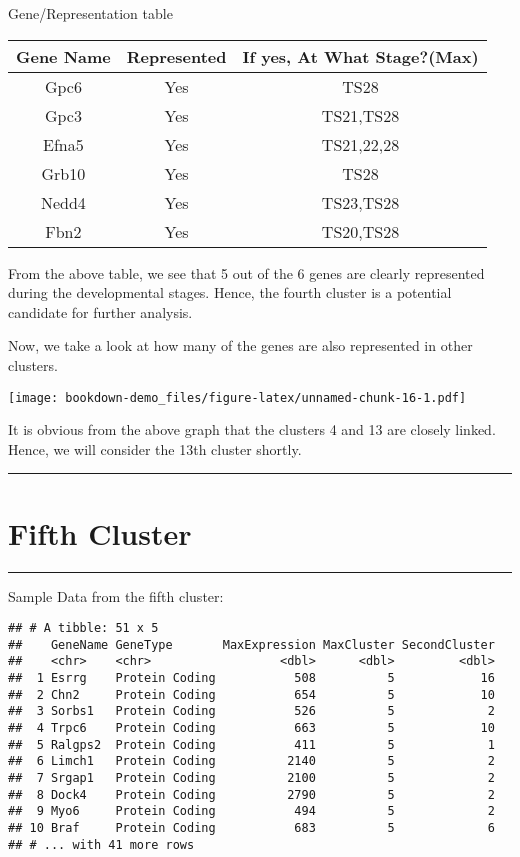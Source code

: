 \documentclass[
]{book}
\begin{document}
Gene/Representation table

\begin{longtable}[]{@{}ccc@{}}
\toprule
Gene Name & Represented & If yes, At What Stage?(Max)\tabularnewline
\midrule
\endhead
Gpc6 & Yes & TS28\tabularnewline
Gpc3 & Yes & TS21,TS28\tabularnewline
Efna5 & Yes & TS21,22,28\tabularnewline
Grb10 & Yes & TS28\tabularnewline
Nedd4 & Yes & TS23,TS28\tabularnewline
Fbn2 & Yes & TS20,TS28\tabularnewline
\bottomrule
\end{longtable}

From the above table, we see that 5 out of the 6 genes are clearly represented during the developmental stages. Hence, the fourth cluster is a potential candidate for further analysis.

Now, we take a look at how many of the genes are also represented in other clusters.

\texttt{[image: bookdown-demo\_files/figure-latex/unnamed-chunk-16-1.pdf]}

It is obvious from the above graph that the clusters 4 and 13 are closely linked. Hence, we will consider the 13th cluster shortly.

\begin{center}\rule{0.5\linewidth}{0.5pt}\end{center}

\hypertarget{fifth-cluster}{%
\chapter{Fifth Cluster}\label{fifth-cluster}}

\begin{center}\rule{0.5\linewidth}{0.5pt}\end{center}

Sample Data from the fifth cluster:

\begin{verbatim}
## # A tibble: 51 x 5
##    GeneName GeneType       MaxExpression MaxCluster SecondCluster
##    <chr>    <chr>                  <dbl>      <dbl>         <dbl>
##  1 Esrrg    Protein Coding           508          5            16
##  2 Chn2     Protein Coding           654          5            10
##  3 Sorbs1   Protein Coding           526          5             2
##  4 Trpc6    Protein Coding           663          5            10
##  5 Ralgps2  Protein Coding           411          5             1
##  6 Limch1   Protein Coding          2140          5             2
##  7 Srgap1   Protein Coding          2100          5             2
##  8 Dock4    Protein Coding          2790          5             2
##  9 Myo6     Protein Coding           494          5             2
## 10 Braf     Protein Coding           683          5             6
## # ... with 41 more rows
\end{verbatim}
\end{document}
